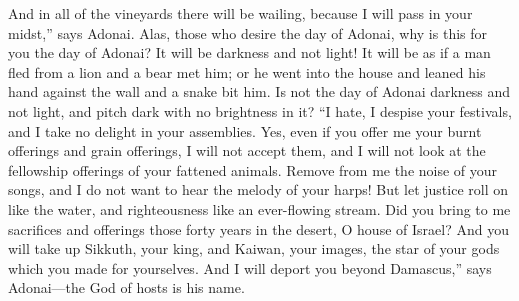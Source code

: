 \begin{biblechapter}
\verse And in all of the vineyards there will be wailing, because I will pass in your midst,” says Adonai.
 Alas, those who desire the day of Adonai, why is this for you the day of Adonai? It will be darkness and not light!
\verse It will be as if a man fled from a lion and a bear met him; or he went into the house and leaned his hand against the wall and a snake bit him.
\verse Is not the day of Adonai darkness and not light, and pitch dark with no brightness in it?
\verse “I hate, I despise your festivals, and I take no delight in your assemblies.
\verse Yes, even if you offer me your burnt offerings and grain offerings, I will not accept them, and I will not look at the fellowship offerings of your fattened animals.
\verse Remove from me the noise of your songs, and I do not want to hear the melody of your harps!
\verse But let justice roll on like the water, and righteousness like an ever-flowing stream.
\verse Did you bring to me sacrifices and offerings those forty years in the desert, O house of Israel?
\verse And you will take up Sikkuth, your king, and Kaiwan, your images, the star of your gods which you made for yourselves.
\verse And I will deport you beyond Damascus,” says Adonai—the God of hosts is his name.
\end{biblechapter}

